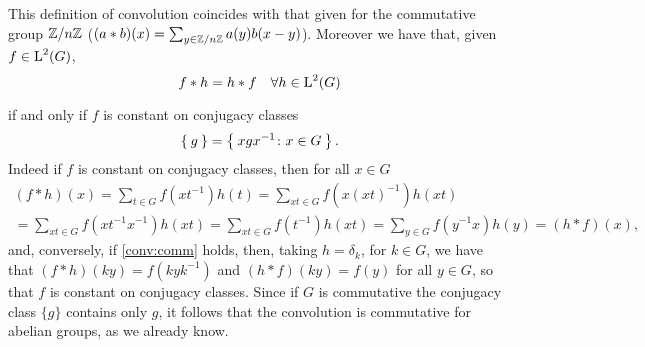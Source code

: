 \begin{rem}
This definition of convolution coincides with that given for the commutative group ${\mathbb Z}/{n{\mathbb Z}}$ ($(a\ast b)(x)=\sum_{y \in {\mathbb Z}/{n{\mathbb Z}}} a(y)b(x-y)$). 
Moreover we have that, given $f\in \operatorname{L}^2(G)$,
\begin{equation}
\label{conv:comm}
f*h=h*f \quad \forall h \in \operatorname{L}^2(G)
\end{equation}

if and only if $f$ is constant on conjugacy classes
\[
\Set{g}=\Set{xgx^{-1}\colon x\in G}.
\]
Indeed if $f$ is constant on conjugacy classes, then for all $x\in G$
\begin{multline*}
(f\ast h)(x) =\sum_{t \in G} f(xt^{-1})h(t)=\sum_{xt \in G} f(x(xt)^{-1})h(xt)\\
=\sum_{xt \in G} f(xt^{-1}x^{-1})h(xt)
=\sum_{xt \in G} f(t^{-1})h(xt)
=\sum_{y \in G} f(y^{-1}x)h(y)= (h*f)(x),
\end{multline*}
and, conversely, if \ref{conv:comm} holds, then, taking $h=\delta_k$, for $k\in G$, we have that $(f\ast h)(ky)=f(kyk^{-1})$ and $(h*f)(ky)=f(y)$ for all $y \in G$, so that $f$ is constant on conjugacy classes.
Since if $G$ is commutative the conjugacy class $\{g\}$ contains only $g$, it follows that the convolution is commutative for abelian groups, as we already know.
\end{rem}
